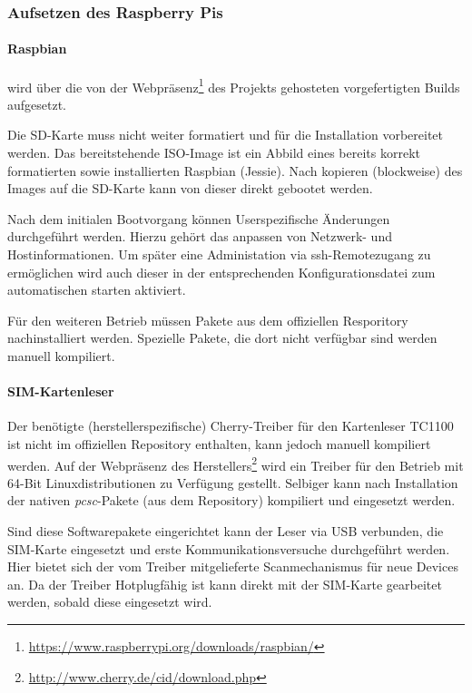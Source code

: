 		\subsubsection{Aufsetzen des Raspberry Pis}
        \label{subsubsec:installpi}
			\paragraph{Raspbian} wird über die von der Webpräsenz\footnote{\url{https://www.raspberrypi.org/downloads/raspbian/}}
            des Projekts gehosteten vorgefertigten Builds aufgesetzt.

            Die SD-Karte muss nicht weiter formatiert und für die Installation vorbereitet werden. Das
            bereitstehende ISO-Image ist ein Abbild eines bereits korrekt formatierten sowie installierten
            Raspbian (Jessie). Nach kopieren (blockweise) des Images auf die SD-Karte kann von dieser direkt
            gebootet werden.

            Nach dem initialen Bootvorgang können Userspezifische Änderungen durchgeführt werden. Hierzu
            gehört das anpassen von Netzwerk- und Hostinformationen. Um später eine Administation via
            \ac{ssh}-Remotezugang zu ermöglichen wird auch dieser in der entsprechenden Konfigurationsdatei
            zum automatischen starten aktiviert.

            Für den weiteren Betrieb müssen Pakete aus dem offiziellen Resporitory
            nachinstalliert werden. Spezielle Pakete, die dort nicht verfügbar sind werden
            manuell kompiliert.

            \paragraph{SIM-Kartenleser} Der benötigte (herstellerspezifische)
            Cherry-Treiber für den Kartenleser TC1100 ist nicht im offiziellen Repository enthalten, kann jedoch
            manuell kompiliert werden. Auf der Webpräsenz des Herstellers\footnote{\url{http://www.cherry.de/cid/download.php}}
            wird ein Treiber für den Betrieb mit 64-Bit Linuxdistributionen zu Verfügung gestellt.
            Selbiger kann nach Installation der nativen \textit{pcsc}-Pakete (aus dem Repository)
            kompiliert und eingesetzt werden.

            Sind diese Softwarepakete eingerichtet kann der Leser via USB verbunden, die SIM-Karte eingesetzt
            und erste Kommunikationsversuche durchgeführt werden. Hier bietet sich der vom
            Treiber mitgelieferte Scanmechanismus für neue Devices an. Da der Treiber
            Hotplugfähig ist kann direkt mit der SIM-Karte gearbeitet werden, sobald diese
            eingesetzt wird.

